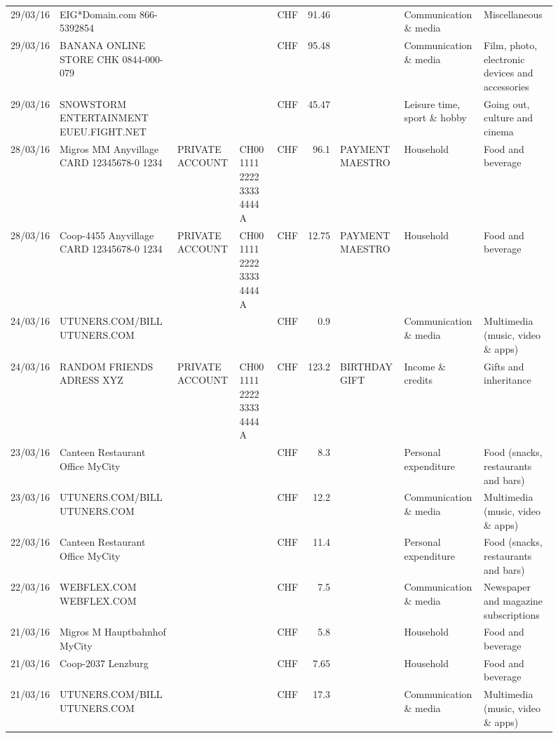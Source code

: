 \begin{landscape}
\begin{sidewaysfigure}
\begin{table}[h]
\begin{center}
\begin{tabular}{rllllrlll}
		29/03/16 & EIG*Domain.com           866-5392854 &       &       & CHF   & 91.46 &       & Communication \& media & Miscellaneous \\
		29/03/16 & BANANA ONLINE STORE CHK   0844-000-079 &       &       & CHF   & 95.48 &       & Communication \& media & Film, photo, electronic devices and accessories \\
		29/03/16 & SNOWSTORM ENTERTAINMENT EUEU.FIGHT.NET &       &       & CHF   & 45.47 &       & Leisure time, sport \& hobby & Going out, culture and cinema \\
		28/03/16 & Migros MM Anyvillage CARD 12345678-0 1234 & PRIVATE ACCOUNT & CH00 1111 2222 3333 4444 A & CHF   & 96.1  & PAYMENT MAESTRO & Household & Food and beverage \\
		28/03/16 & Coop-4455 Anyvillage CARD 12345678-0 1234 & PRIVATE ACCOUNT & CH00 1111 2222 3333 4444 A & CHF   & 12.75 & PAYMENT MAESTRO & Household & Food and beverage \\
		24/03/16 & UTUNERS.COM/BILL          UTUNERS.COM &       &       & CHF   & 0.9   &       & Communication \& media & Multimedia (music, video \& apps) \\
		24/03/16 & RANDOM FRIENDS ADRESS XYZ & PRIVATE ACCOUNT & CH00 1111 2222 3333 4444 A & CHF   & 123.2 & BIRTHDAY GIFT & Income \& credits & Gifts and inheritance \\
		23/03/16 & Canteen Restaurant Office      MyCity &       &       & CHF   & 8.3   &       & Personal expenditure & Food (snacks, restaurants and bars) \\
		23/03/16 & UTUNERS.COM/BILL          UTUNERS.COM &       &       & CHF   & 12.2  &       & Communication \& media & Multimedia (music, video \& apps) \\
		22/03/16 & Canteen Restaurant Office      MyCity &       &       & CHF   & 11.4  &       & Personal expenditure & Food (snacks, restaurants and bars) \\
		22/03/16 & WEBFLEX.COM              WEBFLEX.COM &       &       & CHF   & 7.5   &       & Communication \& media & Newspaper and magazine subscriptions \\
		21/03/16 & Migros M Hauptbahnhof    MyCity &       &       & CHF   & 5.8   &       & Household & Food and beverage \\
		21/03/16 & Coop-2037                Lenzburg &       &       & CHF   & 7.65  &       & Household & Food and beverage \\
		21/03/16 & UTUNERS.COM/BILL          UTUNERS.COM &       &       & CHF   & 17.3  &       & Communication \& media & Multimedia (music, video \& apps) \\

\end{tabular}
\end{center}
\end{table}
\end{sidewaysfigure}
\end{landscape}
